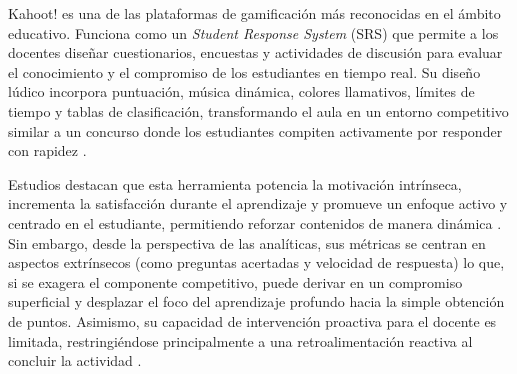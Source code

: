 Kahoot! es una de las plataformas de gamificación más reconocidas en el ámbito educativo. Funciona como un \textit{Student Response System} (SRS) que permite a los docentes diseñar cuestionarios, encuestas y actividades de discusión para evaluar el conocimiento y el compromiso de los estudiantes en tiempo real. Su diseño lúdico incorpora puntuación, música dinámica, colores llamativos, límites de tiempo y tablas de clasificación, transformando el aula en un entorno competitivo similar a un concurso donde los estudiantes compiten activamente por responder con rapidez \cite{singh2024exploring}.

Estudios destacan que esta herramienta potencia la motivación intrínseca, incrementa la satisfacción durante el aprendizaje y promueve un enfoque activo y centrado en el estudiante, permitiendo reforzar contenidos de manera dinámica \cite{singh2024exploring}. Sin embargo, desde la perspectiva de las analíticas, sus métricas se centran en aspectos extrínsecos (como preguntas acertadas y velocidad de respuesta) lo que, si se exagera el componente competitivo, puede derivar en un compromiso superficial y desplazar el foco del aprendizaje profundo hacia la simple obtención de puntos. Asimismo, su capacidad de intervención proactiva para el docente es limitada, restringiéndose principalmente a una retroalimentación reactiva al concluir la actividad \cite{singh2024exploring}.

